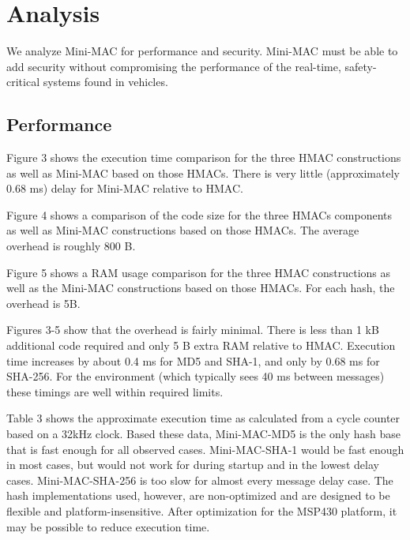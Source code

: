 \section{Analysis}


We analyze Mini-MAC for performance and security. Mini-MAC must be able to add security without compromising the performance of the real-time, safety-critical systems found in vehicles.

\subsection{Performance}
Figure 3 shows the execution time comparison for the three HMAC constructions as well as Mini-MAC based on those HMACs. There is very little (approximately 0.68 ms) delay for Mini-MAC relative to HMAC.

Figure 4 shows a comparison of the code size for the three HMACs components as well as Mini-MAC constructions based on those HMACs. The average overhead is roughly 800 B.

Figure 5 shows a RAM usage comparison for the three HMAC constructions as well as the Mini-MAC constructions based on those HMACs. For each hash, the overhead is 5B.

Figures 3-5 show that the overhead is fairly minimal. There is less than 1 kB additional code required and only 5 B extra RAM relative to HMAC. Execution time increases by about 0.4 ms for MD5 and SHA-1, and only by 0.68 ms for SHA-256. For the environment (which typically sees 40 ms between messages) these timings are well within required limits.

Table 3 shows the approximate execution time as calculated from a cycle counter based on a 32kHz clock. Based these data, Mini-MAC-MD5 is the only hash base that is fast enough for all observed cases. Mini-MAC-SHA-1 would be fast enough in most cases, but would not work for during startup and in the lowest delay cases. Mini-MAC-SHA-256 is too slow for almost every message delay case. The hash implementations used, however, are non-optimized and are designed to be flexible and platform-insensitive. After optimization for the MSP430 platform, it may be possible to reduce execution time.


